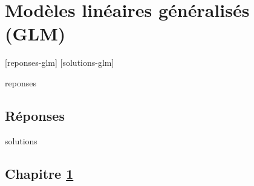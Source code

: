 \documentclass[letterpaper,10pt]{memoir}\usepackage[]{graphicx}\usepackage[]{color}
\newcounter{exercice}[chapter]
\begin{document}





\chapter{Modèles linéaires généralisés (GLM)}
\label{chap:glm}

[reponses-glm]
[solutions-glm]

\begin{Filesave}{reponses}
\bigskip
\section*{Réponses}

\end{Filesave}

\begin{Filesave}{solutions}
\section*{Chapitre \ref{chap:glm}}

\end{Filesave}
\end{document}
